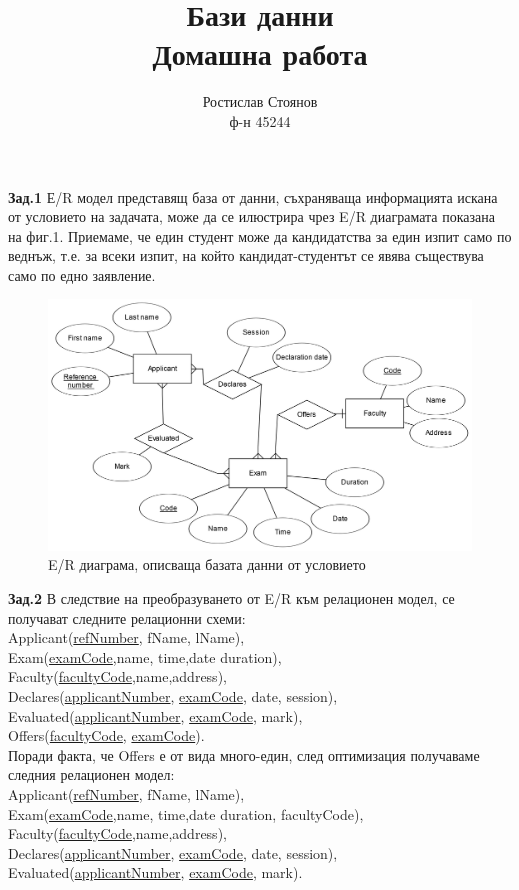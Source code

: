 \documentclass[a4paper,12pt]{article}
\title{Бази данни\\Домашна работа}
\author{Ростислав Стоянов  \\ ф-н 45244}
\date{}
\begin{document}
\maketitle 

\textbf {Зад.1} Е/R модел представящ база от данни, съхраняваща информацията искана от условието на задачата, може да се илюстрира чрез E/R диаграмата показана на фиг.1. Приемаме, че един студент може да кандидатства за един изпит само по веднъж, т.е. за всеки изпит, на който кандидат-студентът се явява съществува само по едно заявление. \\

\begin{figure}[h!]
\hspace*{-75pt}
\includegraphics[width=1.32\linewidth]{er.png}
  \caption{E/R диаграма, описваща базата данни от условието}
\end{figure}
\pagebreak

\textbf {Зад.2}
В следствие на преобразуването от E/R към релационен модел, се получават следните релационни схеми:\\
Applicant(\underline{refNumber}, fName, lName), \\
Exam(\underline{examCode},name, time,date duration), \\
Faculty(\underline{facultyCode},name,address),\\
Declares(\underline{applicantNumber}, \underline{examCode}, date, session),\\
Evaluated(\underline{applicantNumber}, \underline{examCode}, mark), \\
Offers(\underline{facultyCode}, \underline{examCode}). \\

Поради факта, че Offers е от вида много-един, след оптимизация получаваме следния релационен модел: \\
Applicant(\underline{refNumber}, fName, lName), \\
Exam(\underline{examCode},name, time,date duration, facultyCode), \\
Faculty(\underline{facultyCode},name,address),\\
Declares(\underline{applicantNumber}, \underline{examCode}, date, session),\\
Evaluated(\underline{applicantNumber}, \underline{examCode}, mark). \\
\end{document}
